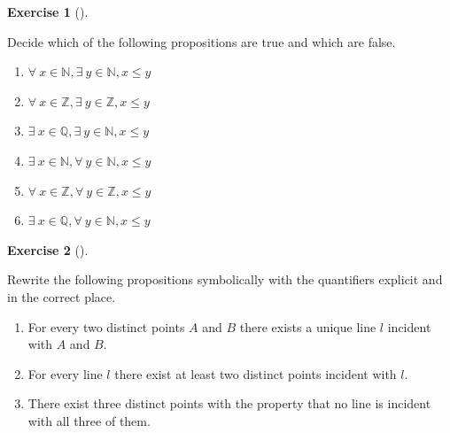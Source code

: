 \documentclass[
  letterpaper,
  10pt,
  reqno,
  twopage,
  openany]{book}
\providecommand{\tightlist}{%
  \setlength{\itemsep}{0pt}\setlength{\parskip}{0pt}}\usepackage{longtable,booktabs,array}
\theoremstyle{plain}
\theoremstyle{definition}
\newtheorem{exercise}{Exercise}[chapter]
\theoremstyle{definition}
\theoremstyle{definition}
\theoremstyle{plain}
\theoremstyle{plain}
\theoremstyle{remark}
\begin{document}
\leavevmode{}%
\begin{exercise}[]\label{exr-propositions-are-true-and-which-are-false}

Decide which of the following propositions are true and which are false.

\begin{enumerate}
\def\labelenumi{\arabic{enumi}.}
\tightlist
\item
  \(\forall \ x\in \mathbb{N}, \exists \ y\in \mathbb{N}, x\leq y\)
\item
  \(\forall \ x\in \mathbb{Z}, \exists \ y\in \mathbb{Z}, x\leq y\)
\item
  \(\exists \ x\in \mathbb{Q}, \exists \ y\in \mathbb{N}, x\leq y\)
\item
  \(\exists \ x\in \mathbb{N}, \forall \ y\in \mathbb{N}, x\leq y\)
\item
  \(\forall \ x\in \mathbb{Z}, \forall \ y\in \mathbb{Z}, x\leq y\)
\item
  \(\exists \ x\in \mathbb{Q}, \forall \ y\in \mathbb{N}, x\leq y\)
\end{enumerate}

\end{exercise}

\leavevmode{}%
\begin{exercise}[]\label{exr-symbolically-with-the-quantifiers-explicit}

Rewrite the following propositions symbolically with the quantifiers
explicit and in the correct place.

\begin{enumerate}
\def\labelenumi{\arabic{enumi}.}
\tightlist
\item
  For every two distinct points \(A\) and \(B\) there exists a unique
  line \(l\) incident with \(A\) and \(B\).
\item
  For every line \(l\) there exist at least two distinct points incident
  with \(l.\)
\item
  There exist three distinct points with the property that no line is
  incident with all three of them.
\end{enumerate}

\end{exercise}
\end{document}
